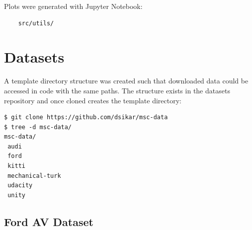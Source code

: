 Plots were generated with Jupyter Notebook:
\begin{verbatim}
    src/utils/
\end{verbatim}

\section{Datasets}

A template directory structure was created such that downloaded data could be accessed in code with the same paths. The structure exists in the datasets repository and once cloned creates the template directory:
\begin{verbatim}
$ git clone https://github.com/dsikar/msc-data
$ tree -d msc-data/
msc-data/
 audi
 ford
 kitti
 mechanical-turk
 udacity
 unity
\end{verbatim}

\subsection{Ford AV Dataset}

